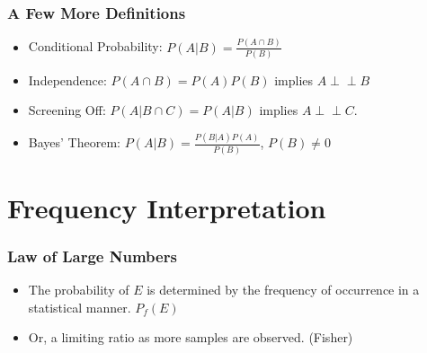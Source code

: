 \documentclass{beamer}
\newcommand{\indep}{\perp \!\!\! \perp}
\begin{document}
\frame
{
\frametitle{A Few More Definitions}

\begin{itemize}
    \item<1-> Conditional Probability: $P(A|B) = \frac{P(A\cap B)}{P(B)}$
    \item<2-> Independence: $P(A\cap B) = P(A)P(B)$ implies $A\indep B$
    \item<3-> Screening Off: $P(A|B\cap C) = P(A|B)$ implies $A\indep C$.  
    \item<4-> Bayes' Theorem:  $P(A|B) = \frac{P(B|A)P(A)}{P(B)}$, $P(B) \neq 0$
\end{itemize}

}






\section{Frequency Interpretation}
\frame
{
\frametitle{Law of Large Numbers}

\begin{itemize}
    \item<1->  The probability of $E$ is determined by the frequency of occurrence in a statistical manner.  $P_f(E)$
    \item<2->  Or, a limiting ratio as more samples are observed. (Fisher)
\end{itemize}

}
\end{document}
